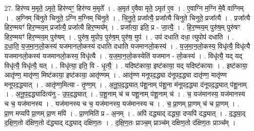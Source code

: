 \documentclass[17pt]{extarticle}
\begin{document}
27. हिर॑ण्य म॒मृते॒ ऽमृते॒ हिर॑ण्यꣳ॒॒ हिर॑ण्य म॒मृते᳚ । . अ॒मृत॑ ए॒वैवा मृते॒ ऽमृत॑ ए॒व । . ए॒वाग्नि म॒ग्नि मे॒वै वाग्निम् । . अ॒ग्निम् चि॑नुते चिनुते॒ ऽग्नि म॒ग्निम् चि॑नुते । . चि॒नु॒ते॒ प्रजा᳚त्यै॒ प्रजा᳚त्यै चिनुते चिनुते॒ प्रजा᳚त्यै । . प्रजा᳚त्यै हिर॒ण्मयꣳ॑ हिर॒ण्मय॒म् प्रजा᳚त्यै॒ प्रजा᳚त्यै हिर॒ण्मय᳚म् । . प्रजा᳚त्या॒ इति॒ प्र - जा॒त्यै॒ । . हि॒र॒ण्मय॒म् पुरु॑ष॒म् पुरु॑षꣳ हिर॒ण्मयꣳ॑ हिर॒ण्मय॒म् पुरु॑षम् । . पुरु॑ष॒ मुपोप॒ पुरु॑ष॒म् पुरु॑ष॒ मुप॑ । . उप॑ दधाति दधा॒ त्युपोप॑ दधाति । . द॒धा॒ति॒ य॒ज॒मा॒न॒लो॒कस्य॑ यजमानलो॒कस्य॑ दधाति दधाति यजमानलो॒कस्य॑ । . य॒ज॒मा॒न॒लो॒कस्य॒ विधृ॑त्यै॒ विधृ॑त्यै यजमानलो॒कस्य॑ यजमानलो॒कस्य॒ विधृ॑त्यै । . य॒ज॒मा॒न॒लो॒कस्येति॑ यजमान - लो॒कस्य॑ । . विधृ॑त्यै॒ यद् यद् विधृ॑त्यै॒ विधृ॑त्यै॒ यत् । . विधृ॑त्या॒ इति॒ वि - धृ॒त्यै॒ । . यदिष्ट॑काया॒ इष्ट॑काया॒ यद् यदिष्ट॑कायाः । . इष्ट॑काया॒ आतृ॑ण्ण॒ मातृ॑ण्ण॒ मिष्ट॑काया॒ इष्ट॑काया॒ आतृ॑ण्णम् । . आतृ॑ण्ण मनूपद॒द्ध्या द॑नूपद॒द्ध्या दातृ॑ण्ण॒ मातृ॑ण्ण मनूपद॒द्ध्यात् । . आतृ॑ण्ण॒मित्या - तृ॒ण्ण॒म् । . अ॒नू॒प॒द॒द्ध्यात् प॑शू॒नाम् प॑शू॒ना म॑नूपद॒द्ध्या द॑नूपद॒द्ध्यात् प॑शू॒नाम् । . अ॒नू॒प॒द॒द्ध्यादित्य॑नु - उ॒प॒द॒द्ध्यात् । . प॒शू॒नाम् च॑ च पशू॒नाम् प॑शू॒नाम् च॑ । . च॒ यज॑मानस्य॒ यज॑मानस्य च च॒ यज॑मानस्य । . यज॑मानस्य च च॒ यज॑मानस्य॒ यज॑मानस्य च । . च॒ प्रा॒णम् प्रा॒णम् च॑ च प्रा॒णम् । . प्रा॒ण मप्यपि॑ प्रा॒णम् प्रा॒ण मपि॑ । . प्रा॒णमिति॑ प्र - अ॒नम् । . अपि॑ दद्ध्याद् दद्ध्या॒ दप्यपि॑ दद्ध्यात् । . द॒द्ध्या॒द् द॒क्षि॒ण॒तो द॑क्षिण॒तो द॑द्ध्याद् दद्ध्याद् दक्षिण॒तः । . द॒क्षि॒ण॒तः प्राञ्च॒म् प्राञ्च॑म् दक्षिण॒तो द॑क्षिण॒तः प्राञ्च᳚म् । \newline
\end{document}
